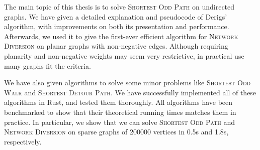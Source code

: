 The main topic of this thesis is to solve \textsc{Shortest Odd Path} on undirected graphs. We have given a detailed explanation and pseudocode of Derigs' \cite{source:derigs_shortest_odd_path} algorithm, with improvements on both its presentation and performance. Afterwards, we used it to give the first-ever efficient algorithm for \textsc{Network Diversion} on planar graphs with non-negative edges. Although requiring planarity and non-negative weights may seem very restrictive, in practical use many graphs fit the criteria.

We have also given algorithms to solve some minor problems like \textsc{Shortest Odd Walk} and \textsc{Shortest Detour Path}. We have successfully implemented all of these algorithms in Rust, and tested them thoroughly. All algorithms have been benchmarked to show that their theoretical running times matches them in practice. In particular, we show that we can solve \textsc{Shortest Odd Path} and \textsc{Network Diversion} on sparse graphs of 200000 vertices in 0.5s and 1.8s, respectively.

